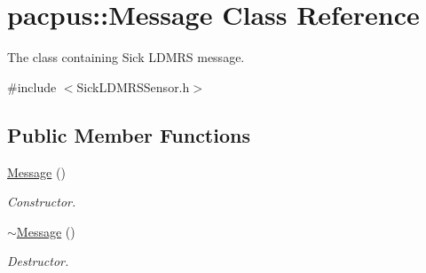 \hypertarget{classpacpus_1_1Message}{\section{pacpus\-:\-:Message Class Reference}
\label{classpacpus_1_1Message}
}


The class containing Sick L\-D\-M\-R\-S message.  




{\ttfamily \#include $<$Sick\-L\-D\-M\-R\-S\-Sensor.\-h$>$}

\subsection*{Public Member Functions}
\begin{DoxyCompactItemize}
\item 
\hypertarget{classpacpus_1_1Message_a181a89e2d455e42308406f0656a1bc8e}{\hyperlink{classpacpus_1_1Message_a181a89e2d455e42308406f0656a1bc8e}{Message} ()}\label{classpacpus_1_1Message_a181a89e2d455e42308406f0656a1bc8e}

\begin{DoxyCompactList}\small\item\em Constructor. \end{DoxyCompactList}\item 
\hypertarget{classpacpus_1_1Message_a33d03742882fc3f80ad8075d452314ed}{\hyperlink{classpacpus_1_1Message_a33d03742882fc3f80ad8075d452314ed}{$\sim$\-Message} ()}\label{classpacpus_1_1Message_a33d03742882fc3f80ad8075d452314ed}

\begin{DoxyCompactList}\small\item\em Destructor. \end{DoxyCompactList}\end{DoxyCompactItemize}
